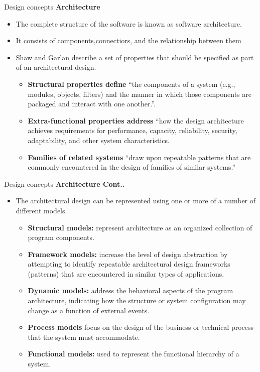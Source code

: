 \documentclass{beamer}
\begin{document}
\begin{frame}{Design concepts}
	\textbf{Architecture}
	\begin{itemize}
		\item The complete structure of the software is known as software architecture.
		\item It consists of components,connectiors, and the relationship between them
	
		\item Shaw and Garlan describe a set of properties that should be specified as part of an architectural 
		design. 
		\begin{itemize}
			\item \textbf{Structural properties define} “the components of a system (e.g., modules, objects, filters) 
			and the manner in which those components are packaged and interact with one another.”.
			\item \textbf{Extra-functional properties address} “how the design architecture achieves requirements 
			for performance, capacity, reliability, security, adaptability, and other system 
			characteristics. 
			\item \textbf{Families of related systems} “draw upon repeatable patterns that are commonly encountered 
			in the design of families of similar systems.”
		\end{itemize}
	\end{itemize}
\end{frame}
\begin{frame}{Design concepts}
	\textbf{Architecture Cont..}
	\begin{itemize}
		\item The architectural design can be represented using one 
		or more of a number of different models.
		\begin{itemize}
			\item \textbf{Structural models:} represent architecture as an organized collection 
			of program components. 
			\item \textbf{Framework models:} increase the level of design abstraction by 
			attempting to identify repeatable architectural design frameworks 
			(patterns) that are encountered in similar types of applications.
			\item \textbf{Dynamic models:} address the behavioral aspects of the program 
			architecture, indicating how the structure or system configuration may 
			change as a function of external events. 
			\item \textbf{Process models} focus on the design of the business or technical 
			process that the system must accommodate. 
			\item \textbf{Functional models:} used to represent the functional hierarchy of a 
			system.
			
		\end{itemize}
	\end{itemize}
\end{frame}
\end{document}
